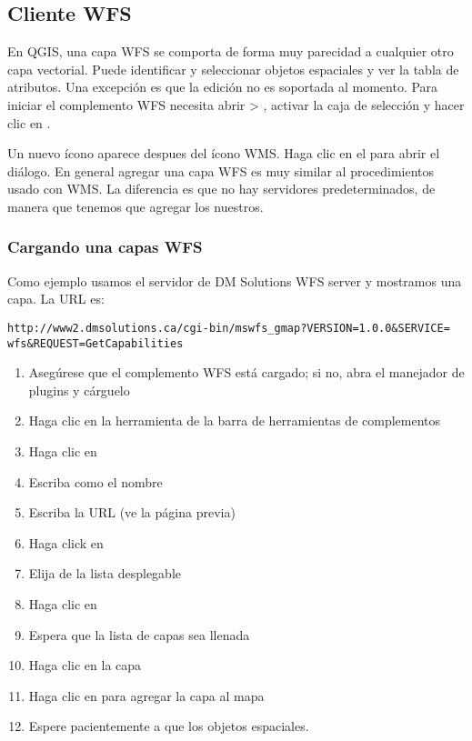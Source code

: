 {\subsection{Cliente WFS}\label{sec:ogc-wfs}

En QGIS, una capa WFS se comporta de forma muy parecidad a cualquier otro capa vectorial. Puede identificar y seleccionar objetos espaciales y ver la tabla de atributos. Una excepción es que la edición no es soportada al momento. Para iniciar el complemento WFS  necesita abrir  > , 
activar la caja de selección  y hacer clic en . 

Un nuevo ícono aparece  despues del ícono WMS. Haga clic en el para abrir el diálogo. En general agregar una capa WFS es muy similar al procedimientos usado con WMS. La diferencia es que no hay servidores predeterminados, de manera que tenemos que agregar los nuestros.

\subsubsection{Cargando una capas WFS}

Como ejemplo usamos el servidor de DM Solutions WFS server y mostramos una capa. La URL es:
\begin{verbatim}
http://www2.dmsolutions.ca/cgi-bin/mswfs_gmap?VERSION=1.0.0&SERVICE=
wfs&REQUEST=GetCapabilities
\end{verbatim}

\begin{enumerate}
  \item Asegúrese que el complemento WFS está cargado; si no, abra el manejador de plugins y cárguelo
  \item Haga clic en la herramienta 
  de la barra de herramientas de complementos
  \item Haga clic en   
  \item Escriba  como el nombre
  \item Escriba la URL (ve la página previa)
  \item Haga click en  
  \item Elija  de la lista desplegable
  \item Haga clic en  
  \item Espera que la lista de capas sea llenada
  \item Haga clic en la capa 
  \item Haga clic en  para agregar la capa al mapa
  \item Espere pacientemente a que los objetos espaciales.
\end{enumerate}

}
